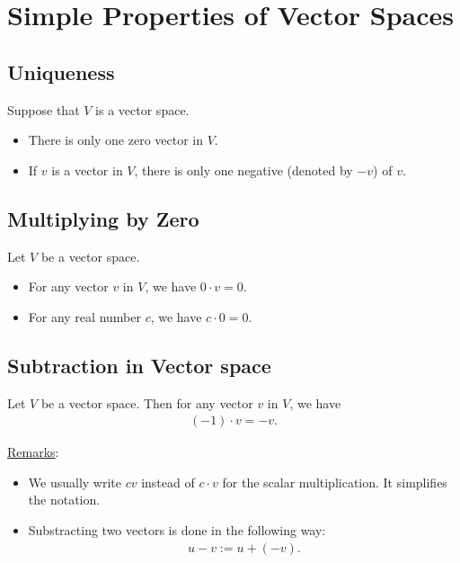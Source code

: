 \documentclass[12pt,a4paper]{article}
\begin{document}
\newpage

\phantom{2}

\newpage

\section{Simple Properties of Vector Spaces}

	\subsection{Uniqueness}
	Suppose that $V$ is a vector space.
		\begin{itemize}
		\item There is only one zero vector in $V$.
		\item If $v$ is a vector in $V$, there is only one negative (denoted by $-v$) of $v$.
		\end{itemize}
	
	\vspace*{18pt}
	
	\subsection{Multiplying by Zero}
	Let $V$ be a vector space.
		\begin{itemize}
		\item For any vector $v$ in $V$, we have $0 \cdot v = 0$.
		\item For any real number $c$, we have $c \cdot 0 = 0$.
		\end{itemize}
	
	\vspace*{18pt}
	
	\subsection{Subtraction in Vector space}
	
	Let $V$ be a vector space. Then for any vector $v$ in $V$, we have
		\begin{align*}
		(-1) \cdot v = -v .
		\end{align*}
	
	\vspace*{24pt}
	
	\underline{Remarks}:
		\begin{itemize}
		\item We usually write $c v$ instead of $c \cdot v$ for the scalar multiplication. It simplifies the notation.
		\item Substracting two vectors is done in the following way: 
			\begin{align*}
			u - v := u + (-v) .
			\end{align*}
		\end{itemize}
	
\end{document}
